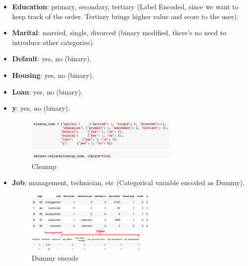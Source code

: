 \begin{itemize}[noitemsep]
\item \textbf{Education}: primary, secondary, tertiary (Label Encoded, since we want to keep track of the order. Tertiary brings higher value and score to the user).
\item \textbf{Marital}: married, single, divorced (binary modified, there's no need to introduce other categories).
\item \textbf{Default}: yes, no (binary).
\item \textbf{Housing}: yes, no (binary).
\item \textbf{Loan}: yes, no (binary).
\item \textbf{y}: yes, no (binary).

\begin{figure}[H]
\centering
\includegraphics[width=0.7\textwidth]{Img/clean_up.png}
\caption{Cleanup}
\end{figure}
\item \textbf{Job}:  management, technician, etc (Categorical variable encoded as Dummy).
\begin{figure}[H]
\centering
\includegraphics[width=0.6\textwidth]{Img/dummy.png}
\caption{Dummy encode}
\end{figure}
\end{itemize}

